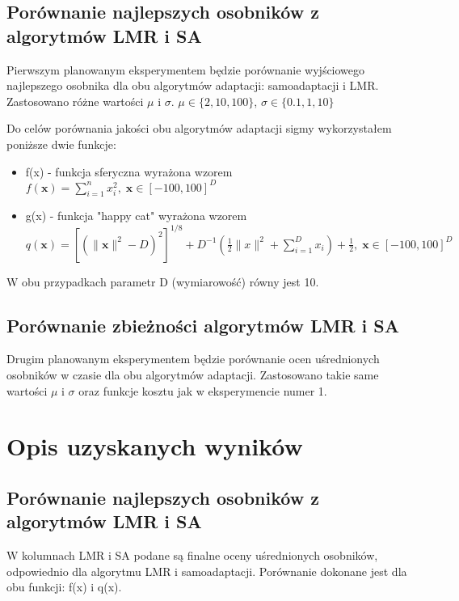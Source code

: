 \documentclass{article}
\begin{document}
\subsection{Porównanie najlepszych osobników z algorytmów LMR i SA}

Pierwszym planowanym eksperymentem będzie porównanie wyjściowego najlepszego osobnika dla obu algorytmów adaptacji: samoadaptacji i LMR. Zastosowano różne wartości $\mu$ i $\sigma$.
$\mu \in \{2, 10, 100\}$,  $\sigma \in \{0.1, 1, 10\}$

Do celów porównania jakości obu algorytmów adaptacji sigmy wykorzystałem poniższe dwie funkcje:

\begin{itemize}
  \item f(x) - funkcja sferyczna wyrażona wzorem $f(\textbf{x}) = \sum^{n}_{i = 1}x^{2}_{i},\; \textbf{x}\in [-100, 100]^{D}$
  \item g(x) - funkcja "happy cat" wyrażona wzorem $q(\pmb{x}) = [(\|\pmb{x}\|^{2} - D)^{2}]^{1/8} + D^{-1}(\frac{1}{2}\|x\|^{2} + \sum^{D}_{i = 1}x_{i}) + \frac{1}{2},\; \pmb{x} \in [-100, 100]^{D}$
\end{itemize}

W obu przypadkach parametr D (wymiarowość) równy jest 10.

\subsection{Porównanie zbieżności algorytmów LMR i SA}

Drugim planowanym eksperymentem będzie porównanie ocen uśrednionych osobników w czasie dla obu algorytmów adaptacji. Zastosowano takie same wartości $\mu$ i $\sigma$ oraz funkcje kosztu jak w eksperymencie numer 1.

\section{Opis uzyskanych wyników}

\subsection{Porównanie najlepszych osobników z algorytmów LMR i SA}

W kolumnach LMR i SA podane są finalne oceny uśrednionych osobników, odpowiednio dla algorytmu LMR i samoadaptacji. Porównanie dokonane jest dla obu funkcji: f(x) i q(x).
\end{document}
